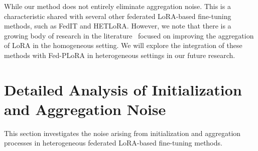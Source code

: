 \documentclass{article} %
\begin{document}
While our method does not entirely eliminate aggregation noise. This is a characteristic shared with several other federated LoRA-based fine-tuning methods, such as FedIT and HETLoRA. However, we note that there is a growing body of research in the literature~\cite{sun2024improving,guo2024selective} focused on improving the aggregation of LoRA in the homogeneous setting. We will explore the integration of these methods with Fed-PLoRA in heterogeneous settings in our future research.


\section{Detailed Analysis of Initialization and Aggregation Noise}\label{appendixsec:analysis}


This section investigates the noise arising from initialization and aggregation processes in heterogeneous federated LoRA-based fine-tuning methods. 





\end{document}
